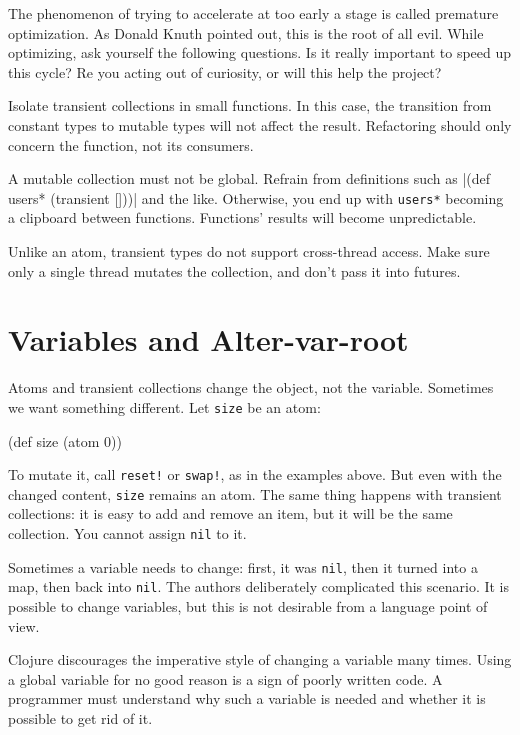 
The phenomenon of trying to accelerate at too early a stage is called premature optimization.
As Donald Knuth pointed out, this is the root of all evil.
While optimizing, ask yourself the following questions. Is it really important to speed up this cycle? Re you acting out of curiosity, or will this help the project?

Isolate transient collections in small functions.
In this case, the transition from constant types to mutable types will not affect the result.
Refactoring should only concern the function, not its consumers.

A mutable collection must not be global.
Refrain from definitions such as \spverb|(def users* (transient []))| and the like.
Otherwise, you end up with \verb|users*| becoming a clipboard between functions.
Functions' results will become unpredictable.

Unlike an atom, transient types do not support cross-thread access.
Make sure only a single thread mutates the collection, and don't pass it into futures.

\section{Variables and Alter-var-root}


\label{alter-var-root}

Atoms and transient collections change the object, not the variable.
Sometimes we want something different.
Let \verb|size| be an atom:

\begin{clojure}
(def size (atom 0))
\end{clojure}

To mutate it, call \verb|reset!| or \verb|swap!|, as in the examples above.
But even with the changed content, \verb|size| remains an atom. The same thing happens with transient collections: it is easy to add and remove an item, but it will be the same collection.
You cannot assign \verb|nil| to it.

Sometimes a variable needs to change: first, it was \verb|nil|, then it turned into a map, then back into \verb|nil|.
The authors deliberately complicated this scenario.
It is possible to change variables, but this is not desirable from a language point of view.

Clojure discourages the imperative style of changing a variable many times.
Using a global variable for no good reason is a sign of poorly written code.
A programmer must understand why such a variable is needed and whether it is possible to get rid of it.

